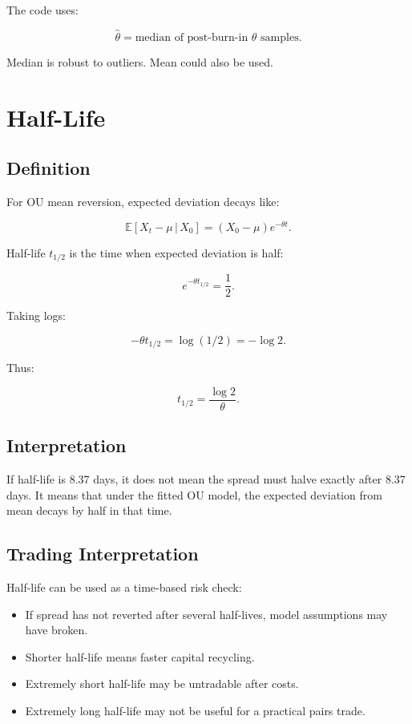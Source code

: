\documentclass[11pt]{article}
\newcommand{\given}{\,|\,}
\newcommand{\E}{\mathbb{E}}
\begin{document}
The code uses:

\[
\hat{\theta} = \text{median of post-burn-in } \theta \text{ samples}.
\]

Median is robust to outliers. Mean could also be used.

\section{Half-Life}

\subsection{Definition}

For OU mean reversion, expected deviation decays like:

\[
\E[X_t-\mu \given X_0] = (X_0-\mu)e^{-\theta t}.
\]

Half-life $t_{1/2}$ is the time when expected deviation is half:

\[
e^{-\theta t_{1/2}} = \frac{1}{2}.
\]

Taking logs:

\[
-\theta t_{1/2} = \log(1/2) = -\log 2.
\]

Thus:

\[
t_{1/2} = \frac{\log 2}{\theta}.
\]

\subsection{Interpretation}

If half-life is 8.37 days, it does not mean the spread must halve exactly after
8.37 days. It means that under the fitted OU model, the expected deviation from
mean decays by half in that time.

\subsection{Trading Interpretation}

Half-life can be used as a time-based risk check:

\begin{itemize}
  \item If spread has not reverted after several half-lives, model assumptions
  may have broken.
  \item Shorter half-life means faster capital recycling.
  \item Extremely short half-life may be untradable after costs.
  \item Extremely long half-life may not be useful for a practical pairs trade.
\end{itemize}
\end{document}
